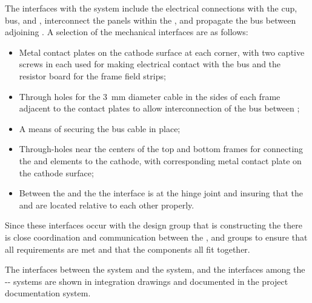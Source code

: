 The interfaces with the  system include the electrical connections with the  cup,  bus, and , interconnect the panels within the , and propagate the  bus between adjoining .  A selection of the mechanical interfaces are as follows:
\begin{itemize}
\item Metal contact plates on the cathode surface at each corner, with two captive screws in each used for making electrical contact with the  bus and the resistor board for the frame field strips;
\item Through holes for the \SI{3}{\milli\m} diameter cable in the sides of each frame adjacent to the contact plates to allow interconnection of the  bus between ;
\item A means of securing the  bus cable in place;
\item Through-holes near the centers of the top and bottom frames for connecting the  and  elements to the cathode, with corresponding metal contact plate on the cathode surface;
\item Between the  and the  the interface is at the hinge joint and insuring that the  and  are located relative to each other properly.
\end{itemize}
Since these interfaces occur with the design group that is constructing the  there is close coordination and communication between the ,  and  groups to ensure that all requirements are met and that the components all fit together.

The interfaces between the  system and the  system, and the interfaces among the -- systems are shown in integration drawings and documented in the project documentation system. 


